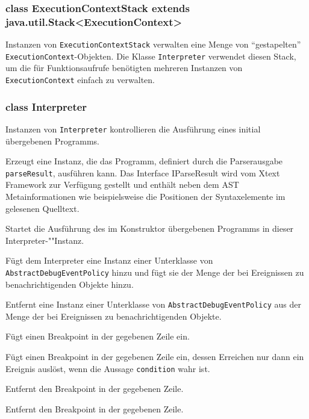 \subsubsection{class ExecutionContextStack extends java.util.Stack<ExecutionContext>}

Instanzen von \texttt{ExecutionContextStack} verwalten eine Menge von "`gestapelten"' \texttt{ExecutionContext}-Objekten. Die Klasse \texttt{Interpreter} verwendet diesen Stack, um die für Funktionsaufrufe benötigten mehreren Instanzen von \texttt{ExecutionContext} einfach zu verwalten.

\subsubsection{class Interpreter}

Instanzen von \texttt{Interpreter} kontrollieren die Ausführung eines initial übergebenen Programms.

\begin{description}
    Erzeugt eine Instanz, die das Programm, definiert durch die Parserausgabe \texttt{parseResult}, ausführen kann. Das Interface IParseResult wird vom Xtext Framework zur Verfügung gestellt und enthält neben dem AST Metainformationen wie beispielsweise die Positionen der Syntaxelemente im gelesenen Quelltext.

    Startet die Ausführung des im Konstruktor übergebenen Programms in dieser Interpreter-""Instanz.

    Fügt dem Interpreter eine Instanz einer Unterklasse von \texttt{AbstractDebugEventPolicy} hinzu und fügt sie der Menge der bei Ereignissen zu benachrichtigenden Objekte hinzu.

    Entfernt eine Instanz einer Unterklasse von \texttt{AbstractDebugEventPolicy} aus der Menge der bei Ereignissen zu benachrichtigenden Objekte.

    Fügt einen Breakpoint in der gegebenen Zeile ein.

    Fügt einen Breakpoint in der gegebenen Zeile ein, dessen Erreichen nur dann ein Ereignis auslöst, wenn die Aussage \texttt{condition} wahr ist.

    Entfernt den Breakpoint in der gegebenen Zeile.

    Entfernt den Breakpoint in der gegebenen Zeile.

\end{description}

